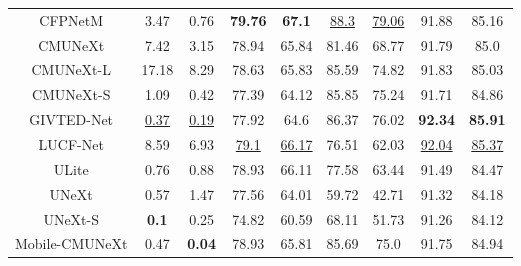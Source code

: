\begin{tabular}{ccc|cc|cc|cc}
\midrule[0.7pt]

CFPNetM
& 3.47 & 0.76 	%
& \textbf{79.76} & \textbf{67.1} 	%
& \underline{88.3} & \underline{79.06} 	%
& 91.88 & 85.16 	%
\\


CMUNeXt
& 7.42 & 3.15 	%
& 78.94 & 65.84 	%
& 81.46 & 68.77 	%
& 91.79 & 85.0 	%
\\

CMUNeXt-L
& 17.18 & 8.29 	%
& 78.63 & 65.83 	%
& 85.59 & 74.82 	%
& 91.83 & 85.03 	%
\\

CMUNeXt-S
& 1.09 & 0.42 	%
& 77.39 & 64.12 	%
& 85.85 & 75.24 	%
& 91.71 & 84.86 	%
\\



GIVTED-Net
& \underline{0.37} & \underline{0.19} 	%
& 77.92 & 64.6 	%
& 86.37 & 76.02 	%
& \textbf{92.34} & \textbf{85.91} 	%
\\

LUCF-Net
& 8.59 & 6.93 	%
& \underline{79.1} & \underline{66.17} 	%
& 76.51 & 62.03 	%
& \underline{92.04} & \underline{85.37} 	%
\\

ULite
& 0.76 & 0.88 	%
& 78.93 & 66.11 	%
& 77.58 & 63.44 	%
& 91.49 & 84.47 	%
\\

UNeXt
& 0.57 & 1.47 	%
& 77.56 & 64.01 	%
& 59.72 & 42.71 	%
& 91.32 & 84.18 	%
\\

UNeXt-S
& \textbf{0.1} & 0.25 	%
& 74.82 & 60.59 	%
& 68.11 & 51.73 	%
& 91.26 & 84.12 	%
\\

\midrule[0.7pt]

Mobile-CMUNeXt
& 0.47 & \textbf{0.04} 	%
& 78.93 & 65.81 	%
& 85.69 & 75.0 	%
& 91.75 & 84.94 	%
\\

\bottomrule[1.1pt]
\end{tabular}